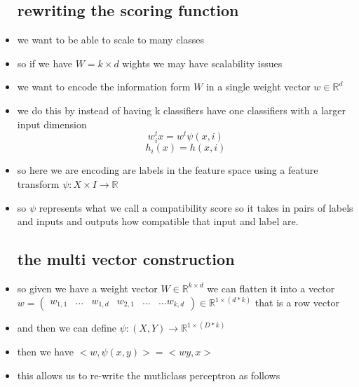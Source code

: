 \documentclass{article}
\begin{document}
\begin{itemize}
\subsection*{rewriting the scoring function}
\item we want to be able to scale to many classes 
\item so if we have $W=k\times d$ wights we may have scalability issues 
\item we want to encode the information form $W$ in a single weight vector $w\in \mathbb{R}^{d}$
\item we do this by instead of having k classifiers have one classifiers with a larger input dimension
$$w_{i}^{t}x=w^{t}\psi(x,i)$$
$$h_{i}(x)=h(x,i) $$
\item so here we are encoding are labels in the feature space using a feature transform $\psi:X\times I\rightarrow \mathbb{R}$
\item so $\psi$ represents what we call a compatibility score so it takes in pairs of labels and inputs and outputs how compatible that input and label are. 
\subsection*{the multi vector construction}
\item so given we have a weight vector $W\in \mathbb{R}^{k\times d}$ we can flatten it into a vector $w=\begin{pmatrix}
    w_{1,1} & ... & w_{1,d} &w_{2,1} &... & ... w_{k,d}
\end{pmatrix}\in \mathbb{R}^{1\times (d* k)}$ that is a row vector 
\item and then we can define $\psi:(X,Y)\rightarrow \mathbb{R}^{1\times (D * k)}$
\item then we have $<w,\psi(x,y)>=<wy,x>$
\item this allows us to re-write the mutliclass perceptron as follows


\end{itemize}
\end{document}
